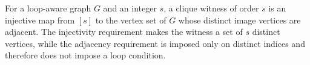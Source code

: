 \begin{definition}
For a loop-aware graph $G$ and an integer $s$, a clique witness of order $s$
is an injective map from $[s]$ to the vertex set of $G$ whose distinct image
vertices are adjacent.  The injectivity requirement makes the witness a set
of $s$ distinct vertices, while the adjacency requirement is imposed only on
distinct indices and therefore does not impose a loop condition.
\end{definition}
